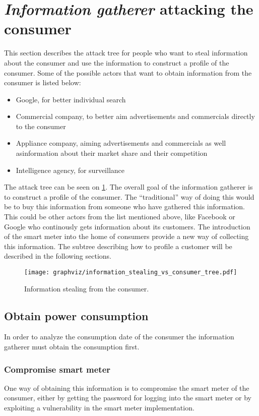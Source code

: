 \section{\emph{Information gatherer} attacking the consumer}
This section describes the attack tree for people who want to steal information about the consumer and use the information to construct a profile of the consumer.
Some of the possible actors that want to obtain information from the consumer is listed below:
\begin{itemize}
\item Google, for better individual search
\item Commercial company, to better aim advertisements and commercials directly to the consumer
\item Appliance company, aiming advertisements and commercials as well asinformation about their market share and their competition
\item Intelligence agency, for surveillance
\end{itemize}

The attack tree can be seen on \cref{information_stealing_tree}.
The overall goal of the information gatherer is to construct a profile of the consumer.
The ``traditional'' way of doing this would be to buy this information from someone who have gathered this information.
This could be other actors from the list mentioned above, like Facebook or Google who continously gets information about its customers.
The introduction of the smart meter into the home of consumers provide a new way of collecting this information.
The subtree describing how to profile a customer will be described in the following sections.


\begin{figure}
  \begin{center}
    \texttt{[image: graphviz/information\_stealing\_vs\_consumer\_tree.pdf]}
  \end{center}
  \caption{Information stealing from the consumer.}
  \label{information_stealing_tree}
\end{figure}

\subsection{Obtain power consumption}
In order to analyze the consumption date of the consumer the information gatherer must obtain the consumption first.

\subsubsection{Compromise smart meter}
One way of obtaining this information is to compromise the smart meter of the consumer, either by getting the password for logging into the smart meter or by exploiting a vulnerability in the smart meter implementation. 


